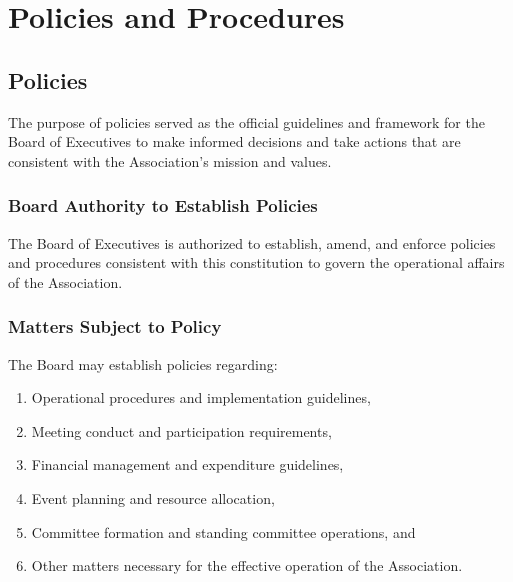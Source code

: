 \chapter{Policies and Procedures}

\section{Policies}

The purpose of policies served as the official guidelines and framework
for the Board of Executives to make informed decisions and take actions
that are consistent with the Association's mission and values.

\subsection{Board Authority to Establish Policies}
The Board of Executives is authorized to establish, amend, and 
enforce policies and procedures consistent with this constitution 
to govern the operational affairs of the Association.

\subsection{Matters Subject to Policy}
The Board may establish policies regarding:
\begin{enumerate}

    \item Operational procedures and implementation guidelines,
    
    \item Meeting conduct and participation requirements,
    
    \item Financial management and expenditure guidelines,
    
    \item Event planning and resource allocation,
    
    \item Committee formation and standing committee operations, and
    
    \item Other matters necessary for the effective operation of the Association.

\end{enumerate}

